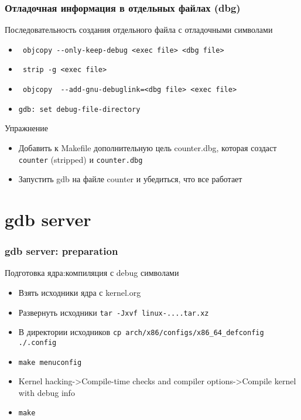 \begin{frame}[fragile]
  \frametitle{Отладочная информация в отдельных файлах (dbg)}
  \begin{center}
    Последовательность создания отдельного файла с отладочными символами
  \end{center}
  \begin{itemize}
    \item \verb+ objcopy --only-keep-debug <exec file> <dbg file>+
    \item \verb+ strip -g <exec file>+
    \item \verb+ objcopy  --add-gnu-debuglink=<dbg file> <exec file> + 
    \item \texttt{gdb: set debug-file-directory}
  \end{itemize} 
\pause
  \begin{center}
   Упражнение
  \end{center}
  \begin{itemize}
    \item Добавить к Makefile дополнительную цель counter.dbg, которая создаст \texttt{counter} (stripped) и \texttt{counter.dbg}
    \item Запустить gdb на файле counter и убедиться, что все работает
  \end{itemize}
\end{frame}  

\section[gdb server]{gdb server}

\begin{frame}
  \frametitle{gdb server: preparation}
  \begin{center}
    {\large Подготовка ядра:компиляция с debug символами}
  \end{center}
  \begin{itemize}
    \item Взять исходники ядра с kernel.org
    \item Развернуть исходники \texttt{tar -Jxvf linux-....tar.xz}
    \item В директории исходников \texttt{cp arch/x86/configs/x86\_64\_defconfig ./.config}
    \item \texttt{make menuconfig}
    \item Kernel hacking->Compile-time checks and compiler options->Compile kernel with debug info
    \item \texttt{make}
  \end{itemize}
\end{frame}

